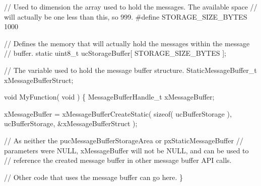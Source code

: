 \begin{DoxyPre}  // Used to dimension the array used to hold the messages.  The available space
  // will actually be one less than this, so 999.
#define STORAGE\_SIZE\_BYTES 1000\end{DoxyPre}



\begin{DoxyPre}  // Defines the memory that will actually hold the messages within the message
  // buffer.
  static uint8\_t ucStorageBuffer[ STORAGE\_SIZE\_BYTES ];\end{DoxyPre}



\begin{DoxyPre}  // The variable used to hold the message buffer structure.
  StaticMessageBuffer\_t xMessageBufferStruct;\end{DoxyPre}



\begin{DoxyPre}  void MyFunction( void )
  \{
  MessageBufferHandle\_t xMessageBuffer;\end{DoxyPre}



\begin{DoxyPre}   xMessageBuffer = xMessageBufferCreateStatic( sizeof( ucBufferStorage ),
                                                ucBufferStorage,
                                                \&xMessageBufferStruct );\end{DoxyPre}



\begin{DoxyPre}   // As neither the pucMessageBufferStorageArea or pxStaticMessageBuffer
   // parameters were NULL, xMessageBuffer will not be NULL, and can be used to
   // reference the created message buffer in other message buffer API calls.\end{DoxyPre}



\begin{DoxyPre}   // Other code that uses the message buffer can go here.
  \}\end{DoxyPre}



\begin{DoxyPre}  \end{DoxyPre}
 